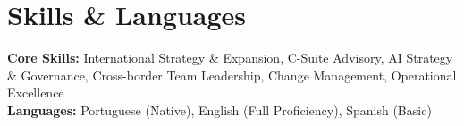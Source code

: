 \documentclass[a4paper,10pt]{article}
\begin{document}
\section{Skills \& Languages}
 \begin{itemize}[leftmargin=0.15in, label={}]
    \small{\item{
     \textbf{Core Skills:}{ International Strategy \& Expansion, C-Suite Advisory, AI Strategy \& Governance, Cross-border Team Leadership, Change Management, Operational Excellence} \\
     \textbf{Languages:}{ Portuguese (Native), English (Full Proficiency), Spanish (Basic)}
    }}
 \end{itemize}

\end{document}
